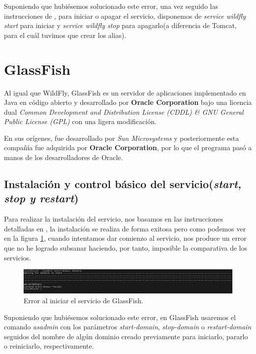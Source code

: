 \documentclass[a4paper, 10pt]{article}
\begin{document}
		Suponiendo que hubiésemos solucionado este error, una vez seguido las instrucciones de
		\cite{WF_install}, para iniciar o apagar el servicio, disponemos de \textit{service
		wildfly start} para iniciar y \textit{service wildfly stop} para apagarlo(a diferencia
		de Tomcat, para el cuál tuvimos que crear los alias).

\section{GlassFish}

	Al igual que WildFly, GlassFish es un servidor de aplicaciones implementado en Java en código
	abierto y desarrollado por \textbf{Oracle Corporation} bajo una licencia dual \textit{Common
	Development and Distribution License (CDDL) \& GNU General Public License (GPL)} con una ligera
	modificación.\cite{GF_official}\cite{GF_install}
	
	En sus orígenes, fue desarrollado por \textit{Sun Microsystems} y posteriormente esta compañía
	fue adquirida por \textbf{Oracle Corporation}, por lo que el programa pasó a manos de los
	desarrolladores de Oracle.

	\subsection{Instalación y control básico del servicio(\textit{start, stop y restart})}
		Para realizar la instalación del servicio, nos basamos en las instrucciones detalladas
		en \cite{GF_install}, la instalación se realiza de forma exitosa pero como podemos ver
		en la figura \ref{fig:GF_Fail}, cuando intentamos dar comienzo al servicio, nos produce
		un error que no he logrado subsanar haciendo, por tanto, imposible la comparativa de los
		servicios.

		\begin{figure}[h!]
			\includegraphics[width=15cm]{Fail_GF.png}
			\caption{Error al iniciar el servicio de GlassFish.}
			\label{fig:GF_Fail}
		\end{figure}

		Suponiendo que hubiésemos solucionado este error, en GlassFish usaremos el comando
		\textit{asadmin} con los parámetros \textit{start-domain}, \textit{stop-domain} o
		\textit{restart-domain} seguidos del nombre de algún dominio creado previamente
		para iniciarlo, pararlo o reiniciarlo, respectivamente.
\end{document}
